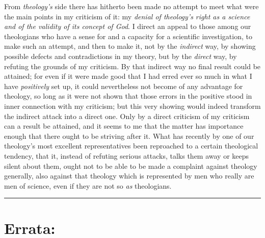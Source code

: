 \documentclass[12pt,a4paper]{book}
\begin{document}
From \emph{theology's} side there has hitherto been made no attempt to meet what
were the main points in my criticism of it: my \emph{denial of theology's right
as a science and of the validity of its concept of God}. I direct an appeal to
those among our theologians who have a sense for and a capacity for a scientific
investigation, to make such an attempt, and then to make it, not by the
\emph{indirect} way, by showing possible defects and contradictions in my
theory, but by the \emph{direct} way, by refuting the grounds of my criticism.
By that indirect way no final result could be attained; for even if it were made
good that I had erred ever so much in what I have \emph{positively} set up, it
could nevertheless not become of any advantage for theology, so long as it were
not shown that those errors in the positive stood in inner connection with my
criticism; but this very showing would indeed transform the indirect attack into
a direct one. Only by a direct criticism of my criticism can a result be
attained, and it seems to me that the matter has importance enough that there
ought
to be striving after it. What has recently by one of our theology's most
excellent representatives been reproached to a certain theological tendency,
that it, instead of refuting serious attacks, talks them away or keeps silent
about them, ought not to be able to be made a complaint against theology
generally, also against that theology which is represented by men who really are
men of science, even if they are not so \emph{as} theologians.

\begin{center}\rule{2cm}{0.4pt}\end{center}

\chapter*{Errata:}
\end{document}
